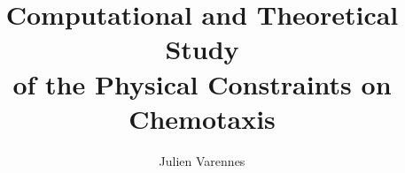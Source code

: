 \documentclass[ece,dissertation]{puthesis}
\title{Computational and Theoretical Study \\ of the Physical Constraints on Chemotaxis}
\author{Julien Varennes}{Varennes, Julien}
\begin{document}
\volume



% 















% 
% 
% 
% 
% 
% 

% 
\end{document}
